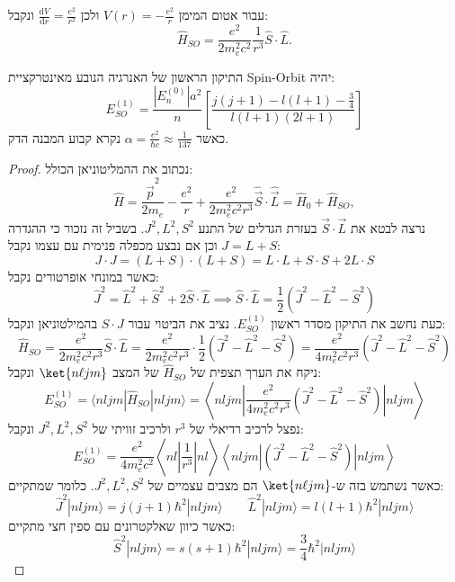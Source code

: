 \documentclass{tstextbook}
\begin{document}
\begin{corollary}
עבור אטום המימן \(V(r)=-\frac{e^{2}}{r}\) ולכן \(\frac{\mathrm{d} V}{\mathrm{d} r}=\frac{e^{2}}{r^{2}}\) ונקבל:
$$\hat{H}_{S O}=\frac{e^{2}}{2m_{e}^{2}c^{2}}\frac{1}{r^{3}}\hat{S}\cdot\hat{L}.$$

\end{corollary}
\begin{proposition}
התיקון הראשון של האנרגיה הנובע מאינטרקציית Spin-Orbit יהיה:
$$E_{S O}^{(1)}=\frac{|E_{n}^{(0)}|a^{2}}{n}\left[\frac{j(j+1)-l(l+1)-\frac{3}{4}}{l(l+1)(2l+1)}\right]$$
כאשר \(\alpha=\frac{e^{2}}{\hbar c}\approx \frac{1}{137}\) נקרא קבוע המבנה הדק.

\end{proposition}
\begin{proof}
נכתוב את ההמליטוניאן הכולל:
$$\hat{H}=\frac{\hat{\vec{p}}^{2}}{2m_{e}}-\frac{e^{2}}{r}+\frac{e^{2}}{2m_{e}^{2}c^{2}r^{3}}\hat{\vec{S}}\cdot\hat{\vec{L}}=\hat{H}_{0}+\hat{H}_{S O},$$
נרצה לבטא את \(\vec{S}\cdot \vec{L}\) בעזרת הגדלים של התנע \(J^{2},L^{2},S^{2}\). בשביל זה נזכור כי ההגדרה \(J=L+S\) וכן אם נבצע מכפלה פנימית עם עצמו נקבל:
$$J\cdot J=(L+S)\cdot(L+S)=L\cdot L+S\cdot S+2L\cdot S$$
כאשר במונחי אופרטורים נקבל:
$$\hat{J}^{2}=\hat{L}^{2}+\hat{S}^{2}+2\hat{S}\cdot\hat{L}\implies\hat{S}\cdot\hat{L}=\frac{1}{2}\left( \hat{J}^{2}-\hat{L}^{2}-\hat{S}^{2} \right)$$
כעת נחשב את התיקון מסדר ראשון \(E_{SO}^{(1)}\). נציב את הביטוי עבור \(S\cdot J\) בהמילטוניאן ונקבל:
$${\hat{H}}_{S O}={\frac{e^{2}}{2m_{e}^{2}c^{2}r^{3}}}{\hat{S}}\cdot{\hat{L}}={\frac{e^{2}}{2m_{e}^{2}c^{2}r^{3}}}\cdot{\frac{1}{2}}({\hat{J}}^{2}-{\hat{L}}^{2}-{\hat{S}}^{2})={\frac{e^{2}}{4m_{e}^{2}c^{2}r^{3}}}({\hat{J}}^{2}-{\hat{L}}^{2}-{\hat{S}}^{2})$$
ניקח את הערך תצפית של \(\hat{H}_{SO}\) של המצב \(\ket{n\ell jm}\) ונקבל:
$$E_{S O}^{(1)}=\langle n l j m|\hat{H}_{S O}|n l j m\rangle=\left\langle n l j m\left|\frac{e^{2}}{4m_{e}^{2}c^{2}r^{3}}(\hat{J}^{2}-\hat{L}^{2}-\hat{S}^{2})\right|n l j m\right\rangle$$
נפצל לרכיב רדיאלי של \(r^{3}\) ולרכיב זוויתי של \(J^{2},L^{2},S^{2}\) ונקבל:
$$E_{S O}^{(1)}=\frac{e^{2}}{4m_{e}^{2}c^{2}}\left\langle n l\left|\frac{1}{r^{3}}\right|n l\right\rangle\left\langle n l j m\left|(\hat{J}^{2}-\hat{L}^{2}-\hat{S}^{2})\right|n l j m\right\rangle$$
כאשר נשתמש בזה ש-\(\ket{n\ell jm}\) הם מצבים עצמיים של \(J^{2},L^{2},S^{2}\). כלומר שמתקיים:
$$\hat{J}^{2}|n l j m\rangle=j(j+1)\hbar^{2}|n l j m\rangle \qquad \hat{L}^{2}|n l j m\rangle=l(l+1)\hbar^{2}|n l j m\rangle$$
כאשר כיוון שאלקטרונים עם ספין חצי מתקיים:
$$\hat{S}^{2}|n l j m\rangle=s(s+1)\hbar^{2}|n l j m\rangle={{\frac{3}{4}}}\hbar^{2}|n l j m\rangle$$

\end{proof}
\end{document}
